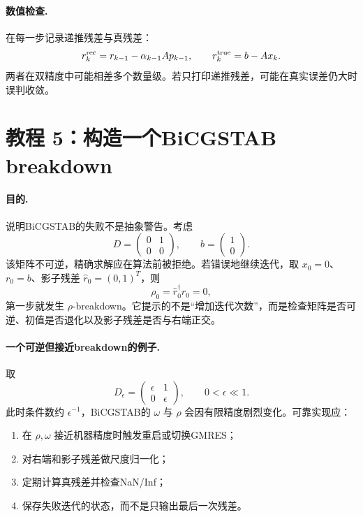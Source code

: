 \documentclass[UTF8,12pt,a4paper,twoside,openany]{ctexbook}
\begin{document}
\paragraph{数值检查.} 在每一步记录递推残差与真残差：
\begin{equation}
  r_k^{\rm rec}=r_{k-1}-\alpha_{k-1}Ap_{k-1},
  \qquad
  r_k^{\rm true}=b-Ax_k.
  \label{eq:tutorial-cg-residuals}
\end{equation}
两者在双精度中可能相差多个数量级。若只打印递推残差，可能在真实误差仍大时误判收敛。

\section{教程 5：构造一个BiCGSTAB breakdown}

\paragraph{目的.} 说明BiCGSTAB的失败不是抽象警告。考虑
\begin{equation}
  D=\begin{pmatrix}0&1\\0&0\end{pmatrix},
  \qquad
  b=\begin{pmatrix}1\\0\end{pmatrix}.
  \label{eq:tutorial-breakdown-system}
\end{equation}
该矩阵不可逆，精确求解应在算法前被拒绝。若错误地继续迭代，取 \(x_0=0\)、\(r_0=b\)、影子残差 \(\hat r_0=(0,1)^T\)，则
\begin{equation}
  \rho_0=\hat r_0^\dagger r_0=0,
  \label{eq:tutorial-breakdown-rho}
\end{equation}
第一步就发生 \(\rho\)-breakdown。它提示的不是“增加迭代次数”，而是检查矩阵是否可逆、初值是否退化以及影子残差是否与右端正交。

\paragraph{一个可逆但接近breakdown的例子.} 取
\begin{equation}
  D_\epsilon=\begin{pmatrix}\epsilon&1\\0&\epsilon\end{pmatrix},
  \qquad 0<\epsilon\ll1.
  \label{eq:tutorial-near-breakdown}
\end{equation}
此时条件数约 \(\epsilon^{-1}\)，BiCGSTAB的 \(\omega\) 与 \(\rho\) 会因有限精度剧烈变化。可靠实现应：
\begin{enumerate}
  \item 在 \(\rho,\omega\) 接近机器精度时触发重启或切换GMRES；
  \item 对右端和影子残差做尺度归一化；
  \item 定期计算真残差并检查NaN/Inf；
  \item 保存失败迭代的状态，而不是只输出最后一次残差。
\end{enumerate}
\end{document}
